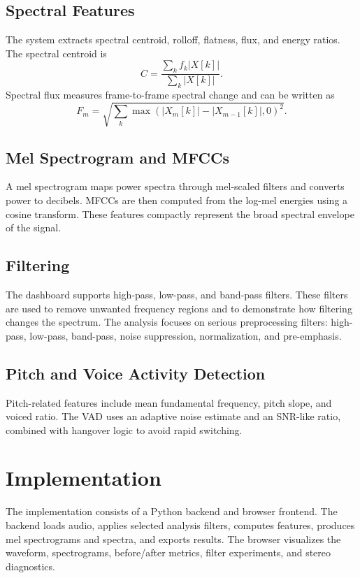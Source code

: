 \documentclass[11pt,a4paper]{article}
\begin{document}
\subsection{Spectral Features}
The system extracts spectral centroid, rolloff, flatness, flux, and energy ratios. The spectral centroid is
\begin{equation}
C = \frac{\sum_k f_k |X[k]|}{\sum_k |X[k]|}.
\end{equation}
Spectral flux measures frame-to-frame spectral change and can be written as
\begin{equation}
F_m = \sqrt{\sum_k \max(|X_m[k]|-|X_{m-1}[k]|,0)^2}.
\end{equation}

\subsection{Mel Spectrogram and MFCCs}
A mel spectrogram maps power spectra through mel-scaled filters and converts power to decibels. MFCCs are then computed from the log-mel energies using a cosine transform. These features compactly represent the broad spectral envelope of the signal.

\subsection{Filtering}
The dashboard supports high-pass, low-pass, and band-pass filters. These filters are used to remove unwanted frequency regions and to demonstrate how filtering changes the spectrum. The analysis focuses on serious preprocessing filters: high-pass, low-pass, band-pass, noise suppression, normalization, and pre-emphasis.

\subsection{Pitch and Voice Activity Detection}
Pitch-related features include mean fundamental frequency, pitch slope, and voiced ratio. The VAD uses an adaptive noise estimate and an SNR-like ratio, combined with hangover logic to avoid rapid switching.

\section{Implementation}
The implementation consists of a Python backend and browser frontend. The backend loads audio, applies selected analysis filters, computes features, produces mel spectrograms and spectra, and exports results. The browser visualizes the waveform, spectrograms, before/after metrics, filter experiments, and stereo diagnostics.
\end{document}
